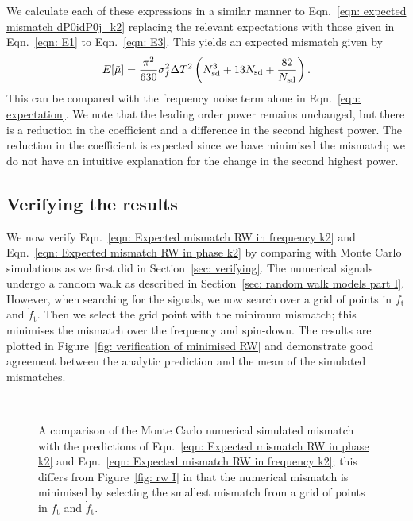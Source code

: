 \documentclass[../full_thesis/full_thesis.tex]{subfiles}
\begin{document}
We calculate each of these expressions in a similar manner to Eqn.~\eqref{eqn:
expected mismatch dP0idP0j_k2} replacing the relevant expectations with those
given in Eqn.~\eqref{eqn: E1} to Eqn.~\eqref{eqn: E3}. This yields an expected
mismatch given by
\begin{equation}
E[\tilde{\mu}] = \frac{\pi^{2} }{630} \sigma_{f}^{2} \Delta T^{2}  \left(N_{\textrm{sd}}^{3} + 13N_{\textrm{sd}} + \frac{82}{N_{\textrm{sd}}} \right).
\label{eqn: Expected mismatch RW in frequency k2}
\end{equation}
This can be compared with the frequency noise term alone in Eqn.~\eqref{eqn:
expectation}. We note that the leading order power remains unchanged, but there
is a reduction in the coefficient and a difference in the second highest
power. The reduction in the coefficient is expected since we have minimised
the mismatch; we do not have an intuitive explanation for the change in the
second highest power.

\subsection{Verifying the results}
\label{sec: verifying minimised}

We now verify Eqn.~\eqref{eqn: Expected mismatch RW in frequency k2} and
Eqn.~\eqref{eqn: Expected mismatch RW in phase k2} by comparing with Monte
Carlo simulations as we first did in Section~\ref{sec: verifying}. The
numerical signals undergo a random walk as described in Section~\ref{sec:
random walk models part I}. However, when searching for the signals, we now search
over a grid of points in $f_\textrm{t}$ and $\dot{f}_\textrm{t}$. Then we
select the grid point with the minimum mismatch; this minimises the mismatch
over the frequency and spin-down. The results are plotted in Figure~\ref{fig:
verification of minimised RW} and demonstrate good agreement between the
analytic prediction and the mean of the simulated mismatches.

\begin{figure}[ht]
\centering
{}
\\
\caption{A comparison of the Monte Carlo numerical simulated mismatch with the
predictions of Eqn.~\eqref{eqn: Expected mismatch RW in
phase k2} and Eqn.~\eqref{eqn: Expected mismatch RW in frequency k2}; this differs
from Figure~\ref{fig: rw I} in that the numerical mismatch is minimised by selecting
the smallest mismatch from a grid of points in $f_\textrm{t}$ and $\dot{f}_\textrm{t}$.}
\label{fig: verification of minimised RW}
\end{figure}
\end{document}
